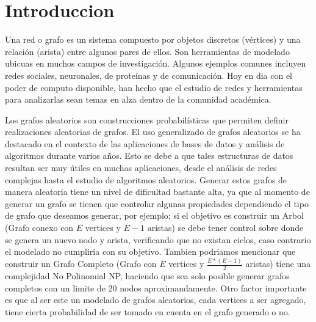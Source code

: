 \documentclass[11pt]{extarticle}
\begin{document}
\newcommand\justificacion{Justificaci\'on }
\newcommand\guion{\item[-]}

\renewcommand{\labelenumii}{\arabic{enumi}.\arabic{enumii}}
\renewcommand{\labelenumiii}{\arabic{enumi}.\arabic{enumii}.\arabic{enumiii}}
\renewcommand{\labelenumiv}{\arabic{enumi}.\arabic{enumii}.\arabic{enumiii}.\arabic{enumiv}}

\section{Introduccion} 
Una red o grafo es un sistema compuesto por objetos discretos (v\'ertices) y una relación (arista) entre algunos pares
de ellos. Son herramientas de modelado ubicuas en muchos campos de investigación. 
Algunos ejemplos comunes incluyen redes sociales, neuronales, de proteínas y de comunicación.
Hoy en dia con el poder de computo disponible, han hecho que el estudio de redes y
herramientas para analizarlas sean temas en alza dentro de la comunidad académica.\hfill \break

Los grafos aleatorios son construcciones probabilísticas que permiten definir realizaciones
aleatorias de grafos. 
El uso generalizado de grafos aleatorios se ha destacado en el contexto de las  
aplicaciones de bases de datos y análisis de algoritmos durante 
varios años. Esto se debe a que tales estructuras de datos resultan ser muy útiles 
en muchas  aplicaciones, desde el análisis de redes complejas hasta el estudio de 
algoritmos aleatorios. Generar estos grafos de manera aleatoria tiene un nivel de dificultad
bastante alta, ya que al momento de generar un grafo se tienen que controlar algunas propiedades 
dependiendo el tipo de grafo que deseamos generar, por ejemplo: si el objetivo es construir un Arbol 
(Grafo conexo con \(E\) vertices y \(E - 1\) aristas)
se debe tener control sobre donde se genera un nuevo nodo y arista, verificando que no existan
ciclos, caso contrario el modelado no cumpliria con su objetivo. Tambien podriamos mencionar que construir
un Grafo Completo (Grafo con \(E\) vertices y \( \frac{E * (E - 1)}{2}\) aristas) tiene una complejidad No Polinomial NP, 
haciendo que sea solo posible generar grafos completos con un limite de 20 nodos aproximandamente.
Otro factor importante es que al ser este un modelado de grafos aleatorios, cada vertices a ser agregado,
tiene cierta probabilidad de ser tomado en cuenta en el grafo generado o no. \hfill\break 
\end{document}
